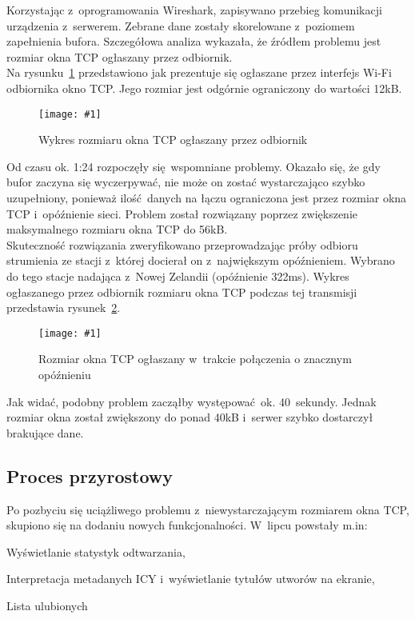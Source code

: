 \documentclass[polish]{aghengthesis}
\let\tempone\itemize
\let\temptwo\enditemize
\renewenvironment{itemize}{\tempone\setlength{\itemsep}{0cm}}{\temptwo}
\newcommand{\imgint}[4]{
	\begin{figure}[{#4}]
		\centering
		\texttt{[image: \#1]}
		\caption{#2}
		\label{#1}
	\end{figure}
}
\newcommand{\imgh}[3]{\imgint{#1}{#2}{#3}{H}}
\begin{document}
			Korzystając z~oprogramowania Wireshark\textsuperscript{\cite{wireshark}}, zapisywano przebieg komunikacji urządzenia z~serwerem.
			Zebrane dane zostały skorelowane z~poziomem zapełnienia bufora. Szczegółowa analiza wykazała, że źródłem problemu jest rozmiar okna TCP ogłaszany przez odbiornik.
			$ $\\
			
			Na rysunku~\ref{4/tcp_fail} przedstawiono jak prezentuje się ogłaszane przez interfejs \mbox{Wi-Fi} odbiornika okno TCP.
			Jego rozmiar jest odgórnie ograniczony do wartości 12kB.
			\imgh{4/tcp_fail}{Wykres rozmiaru okna TCP ogłaszany przez odbiornik}{0.85}
			
			Od czasu ok. 1:24 rozpoczęły się wspomniane problemy. Okazało się, że gdy bufor zaczyna się wyczerpywać, nie może on zostać wystarczająco szybko uzupełniony, ponieważ ilość danych na łączu ograniczona jest przez rozmiar okna TCP i~opóźnienie sieci.
			Problem został rozwiązany poprzez zwiększenie maksymalnego rozmiaru okna TCP do 56kB.
			$ $\\
			
			Skuteczność rozwiązania zweryfikowano przeprowadzając próby odbioru strumienia ze stacji z~której docierał on z~największym opóźnieniem. Wybrano do tego stacje nadająca z~Nowej Zelandii (opóźnienie 322ms). Wykres ogłaszanego przez odbiornik rozmiaru okna TCP podczas tej transmisji przedstawia rysunek~\ref{4/tcp_good}.
			
			\imgh{4/tcp_good}{Rozmiar okna TCP ogłaszany w~trakcie połączenia o znacznym opóźnieniu}{0.6}

			Jak widać, podobny problem zacząłby występować ok. 40~sekundy. Jednak rozmiar okna został zwiększony do ponad 40kB i~serwer szybko dostarczył brakujące dane.
			
		\subsection{Proces przyrostowy}
			Po pozbyciu się uciążliwego problemu z~niewystarczającym rozmiarem okna TCP, skupiono się na dodaniu nowych funkcjonalności. W~lipcu powstały m.in:
			\begin{itemize}
				\item Wyświetlanie statystyk odtwarzania,
				\item Interpretacja metadanych ICY i~wyświetlanie tytułów utworów na ekranie,
				\item Lista ulubionych
			\end{itemize}
			
\end{document}
